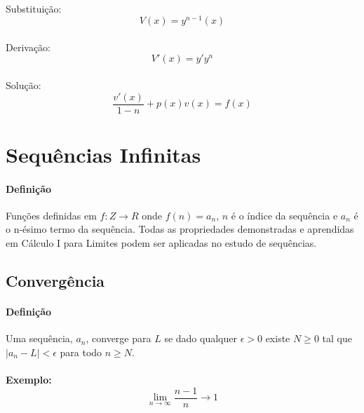 \documentclass{article}
\begin{document}
                \paragraph{}Substituição:
                    \begin{equation}
                        V(x)=y^{n-1}(x)
                    \end{equation}
                \paragraph{}Derivação:
                    \begin{equation}
                        V'(x)=y'y^{n}
                    \end{equation}
                \paragraph{}Solução:
                    \begin{equation}
                        \frac{v'(x)}{1-n}+p(x)v(x)=f(x)
                    \end{equation}


    \section{Sequências Infinitas}
        \paragraph{Definição}Funções definidas em $f:Z\to R$ onde $f(n)=a_{n}$, $n$ é o índice da sequência e $a_{n}$ é o n-ésimo termo da sequência. Todas as propriedades demonstradas e aprendidas em Cálculo I para Limites podem ser aplicadas no estudo de sequências. 
        
        \subsection{Convergência}
            \paragraph{Definição}Uma sequência, $a_{n}$, converge para $L$ se dado qualquer $\epsilon > 0$ existe $N \ge 0$ tal que $|a_{n}-L|<\epsilon$ para todo $n \ge N$.
            \paragraph{}\textbf{Exemplo:}
                \begin{equation}
                    \lim_{n\to\infty}\frac{n-1}{n}\rightarrow1
                \end{equation}
\end{document}
